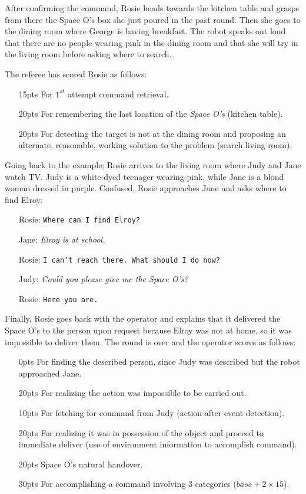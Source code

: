 After confirming the command, Rosie heads towards the kitchen table and grasps from there the Space O's box she just poured in the past round. Then she goes to the dining room where George is having breakfast. The robot speaks out loud that there are no people wearing pink in the dining room and that she will try in the living room before asking where to search.

The referee has scored Rosie as follows:
\begin{itemize}
	\item[15pts] For $1^{st}$ attempt command retrieval.
	\item[20pts] For remembering the last location of the \textit{Space O's} (kitchen table).
	\item[20pts] For detecting the target is not at the dining room and proposing an alternate, reasonable, working solution to the problem (search living room).
\end{itemize}

Going back to the example; Rosie arrives to the living room where Judy and Jane watch TV. Judy is a white-dyed teenager wearing pink, while Jane is a blond woman dressed in purple. Confused, Rosie approaches Jane and asks where to find Elroy:
\begin{itemize}
	\item[Rosie:] \texttt{Where can I find Elroy?}
	\item[Jane: ] \textit{Elroy is at school.}
	\item[Rosie:] \texttt{I can't reach there. What should I do now?}
	\item[Judy: ] \textit{Could you please give me the Space O's?}
	\item[Rosie:] \texttt{Here you are.}
\end{itemize}

Finally, Rosie goes back with the operator and explains that it delivered the Space O's to the person upon request because Elroy was not at home, so it was impossible to deliver them. The round is over and the operator scores as follows:
\begin{itemize}
	\item[ 0pts] For finding the described person, since Judy was described but the robot approached Jane.
	\item[20pts] For realizing the action was impossible to be carried out.
	\item[10pts] For fetching for command from Judy (action after event detection).
	\item[20pts] For realizing it was in possession of the object and proceed to immediate deliver (use of environment information to accomplish command).
	\item[20pts] Space O's natural handover.
	\item[30pts] For accomplishing a command involving 3 categories ($base + 2\times15$).
\end{itemize}

